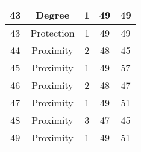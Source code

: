 \documentclass[results.tex]{subfiles}
\begin{document}
\begin{center}
\begin{tabular}{| c || c | c | c | c |}
            \hline
            43                      & Degree                       & 1                      & 49                      & 49                   \\
            \hline
            43                      & Protection                   & 1                      & 49                      & 49                   \\
            \hline
            44                      & Proximity                    & 2                      & 48                      & 45                   \\
            \hline
            45                      & Proximity                    & 1                      & 49                      & 57                   \\
            \hline
            46                      & Proximity                    & 2                      & 48                      & 47                   \\
            \hline
            47                      & Proximity                    & 1                      & 49                      & 51                   \\
            \hline
            48                      & Proximity                    & 3                      & 47                      & 45                   \\
            \hline
            49                      & Proximity                    & 1                      & 49                      & 51                   \\
            \hline
        \end{tabular}
    \end{center}
\end{document}
